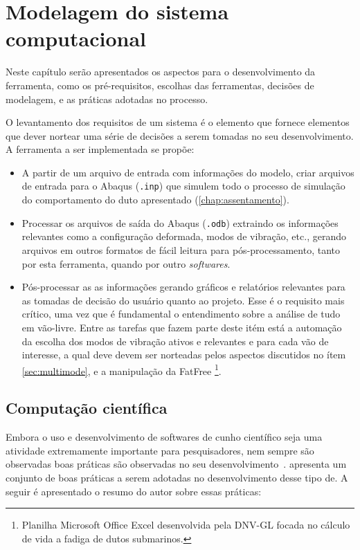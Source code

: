 \chapter{Modelagem do sistema computacional}

Neste capítulo serão apresentados os aspectos para o desenvolvimento da ferramenta, como os pré-requisitos, escolhas das ferramentas, decisões de modelagem, e as práticas adotadas no processo.

O levantamento dos requisitos de um sistema é o elemento que fornece elementos que dever nortear uma série de decisões a serem tomadas no seu desenvolvimento.
A ferramenta a ser implementada se propõe:
\begin{itemize}
    \item A partir de um arquivo de entrada com informações do modelo, criar arquivos de entrada para o Abaqus (\texttt{.inp}) que simulem todo o processo de simulação do comportamento do duto apresentado (\autoref{chap:assentamento}).
    \item Processar os arquivos de saída do Abaqus (\texttt{.odb}) extraindo os informações relevantes como a configuração deformada, modos de vibração, etc., gerando arquivos em outros formatos de fácil leitura para pós-processamento, tanto por esta ferramenta, quando por outro \textit{softwares}.
    \item Pós-processar as as informações gerando gráficos e relatórios relevantes para as tomadas de decisão do usuário quanto ao projeto. Esse é o requisito mais crítico, uma vez que é fundamental o entendimento sobre a análise de tudo em vão-livre. Entre as tarefas que fazem parte deste itém está a automação da escolha dos modos de vibração ativos e relevantes e para cada vão de interesse, a qual deve devem ser norteadas pelos aspectos discutidos no ítem \ref{sec:multimode}, e a manipulação da FatFree \footnote{Planilha Microsoft Office Excel desenvolvida pela DNV-GL focada no cálculo de vida a fadiga de dutos submarinos.}.
\end{itemize}

\section{Computação científica}

Embora o uso e desenvolvimento de softwares de cunho científico seja uma atividade extremamente importante para pesquisadores, nem sempre são observadas boas práticas são observadas no seu desenvolvimento~\cite{Hannay2009}.
 apresenta um conjunto de boas práticas a serem adotadas no desenvolvimento desse tipo de. A seguir é apresentado o resumo do autor sobre essas práticas:

